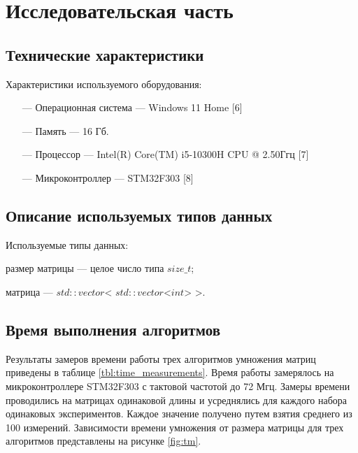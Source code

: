 \chapter{Исследовательская часть}

\section{Технические характеристики}
Характеристики используемого оборудования:
\begin{itemize}
    \item[---] Операционная система --- Windows 11 Home [6]
    \item[---] Память --- 16 Гб.
    \item[---] Процессор --- Intel(R) Core(TM) i5-10300H CPU @ 2.50Ггц [7]
    \item[---] Микроконтроллер --- STM32F303 [8]
\end{itemize}

\section{Описание используемых типов данных}
Используемые типы данных:

размер матрицы --- целое число типа $size\_t$;

матрица --- $std::vector$< $std::vector$<$int$> >.


\clearpage

\section{Время выполнения алгоритмов}
Результаты замеров времени работы трех алгоритмов умножения матриц приведены в таблице \ref{tbl:time_measurements}. Время работы замерялось на микроконтроллере STM32F303 с тактовой частотой до 72 Мгц. Замеры времени проводились на матрицах одинаковой длины и усреднялись для каждого набора одинаковых экспериментов. Каждое значение получено путем взятия среднего из 100 измерений. Зависимости времени умножения от размера матрицы для трех алгоритмов представлены на рисунке \ref{fig:tm}.

